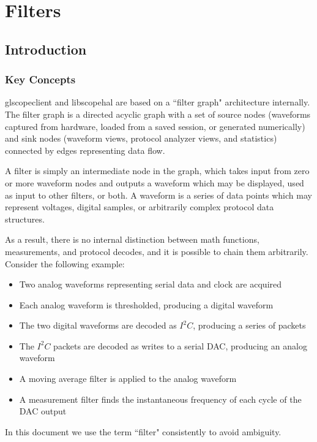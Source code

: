 \chapter{Filters}

\section{Introduction}

\subsection{Key Concepts}

glscopeclient and libscopehal are based on a ``filter graph" architecture internally. The filter graph is a directed
acyclic graph with a set of source nodes (waveforms captured from hardware, loaded from a saved session, or generated
numerically) and sink nodes (waveform views, protocol analyzer views, and statistics) connected by edges representing
data flow.

A filter is simply an intermediate node in the graph, which takes input from zero or more waveform nodes and outputs a
waveform which may be displayed, used as input to other filters, or both. A waveform is a series of data points which
may represent voltages, digital samples, or arbitrarily complex protocol data structures.

As a result, there is no internal distinction between math functions, measurements, and protocol decodes, and it is
possible to chain them arbitrarily. Consider the following example:

\begin{itemize}
\item Two analog waveforms representing serial data and clock are acquired
\item Each analog waveform is thresholded, producing a digital waveform
\item The two digital waveforms are decoded as $I^2C$, producing a series of packets
\item The $I^2C$ packets are decoded as writes to a serial DAC, producing an analog waveform
\item A moving average filter is applied to the analog waveform
\item A measurement filter finds the instantaneous frequency of each cycle of the DAC output
\end{itemize}

In this document we use the term ``filter" consistently to avoid ambiguity.

